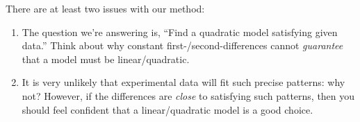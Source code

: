 
There are at least two issues with our method:
\begin{enumerate}
  \item The question we're answering is, ``Find a quadratic model satisfying given data.'' Think about why constant first-/second-differences cannot \emph{guarantee} that a model must be linear/quadratic. 

  \item It is very unlikely that experimental data will fit such precise patterns: why not? However, if the differences are \emph{close} to satisfying such patterns, then you should feel confident that a linear/quadratic model is a good choice.
\end{enumerate}
\goodbreak


